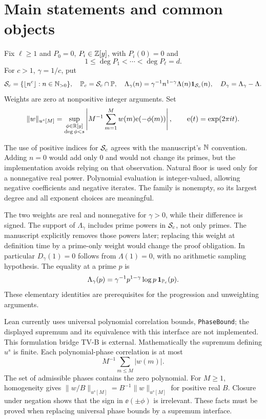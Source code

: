 \section{Main statements and common objects}
\begin{definition}\label{def:objects}
Fix $\ell\geq1$ and $P_0=0$, $P_i\in\mathbb Z[y]$, with $P_i(0)=0$ and
\[
 1\leq\deg P_1<\cdots<\deg P_\ell=d.
\]
For $c>1$, $\gamma=1/c$, put
\[
 \mathcal S_c=\{\lfloor n^c\rfloor:n\in\mathbb N_{>0}\},\quad
 \mathbb P_c=\mathcal S_c\cap\mathbb P,\quad
 \Lambda_\gamma(n)=\gamma^{-1}n^{1-\gamma}\Lambda(n)\mathbf 1_{\mathcal S_c}(n),\quad
 D_\gamma=\Lambda_\gamma-\Lambda.
\]
Weights are zero at nonpositive integer arguments. Set
\[
 \|w\|_{u^s[M]}=
 \sup_{\substack{\phi\in\mathbb R[y]\\\deg\phi<s}}
 \left|M^{-1}\sum_{m=1}^M w(m)\mathrm e(-\phi(m))\right|,
 \qquad\mathrm e(t)=\exp(2\pi it).
\]
\end{definition}
\ifDetailed
The use of positive indices for $\mathcal S_c$ agrees with the manuscript's $\mathbb N$ convention. Adding $n=0$ would add only $0$ and would not change its primes, but the implementation avoids relying on that observation. Natural floor is used only for a nonnegative real power. Polynomial evaluation is integer-valued, allowing negative coefficients and negative iterates. The family is nonempty, so its largest degree and all exponent choices are meaningful.

The two weights are real and nonnegative for $\gamma>0$, while their difference is signed. The support of $\Lambda_\gamma$ includes prime powers in $\mathcal S_c$, not only primes. The manuscript explicitly removes those powers later; replacing this weight at definition time by a prime-only weight would change the proof obligation. In particular $D_\gamma(1)=0$ follows from $\Lambda(1)=0$, with no arithmetic sampling hypothesis. The equality at a prime $p$ is
\[
 \Lambda_\gamma(p)=\gamma^{-1}p^{1-\gamma}\log p\,\mathbf 1_{\mathbb P_c}(p).
\]
These elementary identities are prerequisites for the progression and unweighting arguments.

Lean currently uses universal polynomial correlation bounds, \texttt{PhaseBound}; the displayed supremum and its equivalence with this interface are not implemented. This formulation bridge TV-B is external. Mathematically the supremum defining $u^s$ is finite. Each polynomial-phase correlation is at most
\[M^{-1}\sum_{m\leq M}|w(m)|.\] The set of admissible phases contains the zero polynomial. For $M\geq1$, homogeneity gives $\|w/B\|_{u^s[M]}=B^{-1}\|w\|_{u^s[M]}$ for positive real $B$. Closure under negation shows that the sign in $\ee(\pm\phi)$ is irrelevant. These facts must be proved when replacing universal phase bounds by a supremum interface.
\fi

